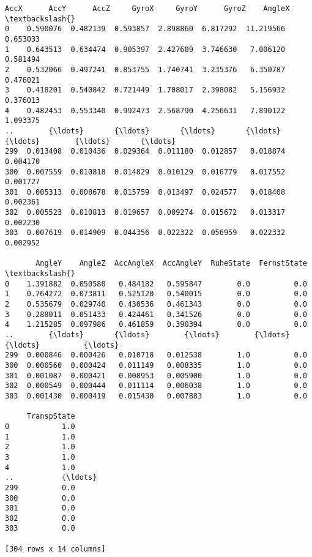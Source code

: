 \documentclass[11pt]{article}
\makeatletter
\newcommand{\boxspacing}{\kern\kvtcb@left@rule\kern\kvtcb@boxsep}
\newcommand{\prompt}[4]{
        {\ttfamily\llap{{\color{#2}[#3]:\hspace{3pt}#4}}\vspace{-\baselineskip}}
    }
\makeatother
\begin{document}
            \begin{tcolorbox}[breakable, size=fbox, boxrule=.5pt, pad at break*=1mm, opacityfill=0]
\prompt{Out}{outcolor}{93}{\boxspacing}
\begin{Verbatim}[commandchars=\\\{\}]
         AccX      AccY      AccZ     GyroX     GyroY      GyroZ    AngleX  \textbackslash{}
0    0.590076  0.482139  0.593857  2.898860  6.817292  11.219566  0.653033
1    0.643513  0.634474  0.905397  2.427609  3.746630   7.006120  0.581494
2    0.532066  0.497241  0.853755  1.740741  3.235376   6.350787  0.476021
3    0.418201  0.540842  0.721449  1.708017  2.398082   5.156932  0.376013
4    0.482453  0.553340  0.992473  2.568790  4.256631   7.890122  1.093375
..        {\ldots}       {\ldots}       {\ldots}       {\ldots}       {\ldots}        {\ldots}       {\ldots}
299  0.013408  0.010436  0.029364  0.011180  0.012857   0.018874  0.004170
300  0.007559  0.010818  0.014829  0.010129  0.016779   0.017552  0.001727
301  0.005313  0.008678  0.015759  0.013497  0.024577   0.018408  0.002361
302  0.005523  0.010813  0.019657  0.009274  0.015672   0.013317  0.002230
303  0.007619  0.014909  0.044356  0.022322  0.056959   0.022332  0.002952

       AngleY    AngleZ  AccAngleX  AccAngleY  RuheState  FernstState  \textbackslash{}
0    1.391882  0.050580   0.484182   0.595847        0.0          0.0
1    0.764272  0.073811   0.525120   0.540015        0.0          0.0
2    0.535679  0.029740   0.430536   0.461343        0.0          0.0
3    0.288011  0.051433   0.424461   0.341526        0.0          0.0
4    1.215285  0.097986   0.461859   0.390394        0.0          0.0
..        {\ldots}       {\ldots}        {\ldots}        {\ldots}        {\ldots}          {\ldots}
299  0.000846  0.000426   0.010718   0.012538        1.0          0.0
300  0.000560  0.000424   0.011149   0.008335        1.0          0.0
301  0.001087  0.000421   0.008953   0.005900        1.0          0.0
302  0.000549  0.000444   0.011114   0.006038        1.0          0.0
303  0.001430  0.000419   0.015430   0.007883        1.0          0.0

     TranspState
0            1.0
1            1.0
2            1.0
3            1.0
4            1.0
..           {\ldots}
299          0.0
300          0.0
301          0.0
302          0.0
303          0.0

[304 rows x 14 columns]
\end{Verbatim}
\end{tcolorbox}
        
\end{document}
